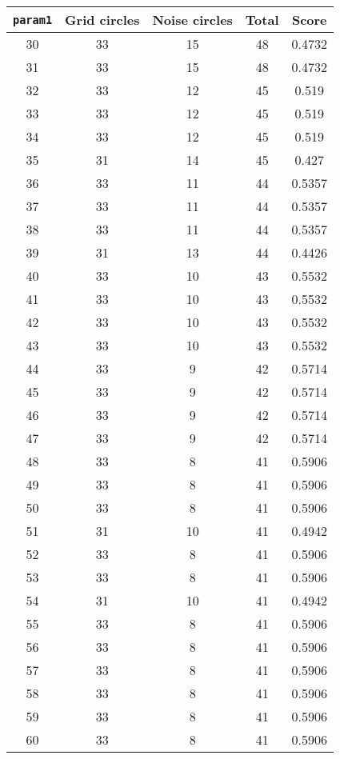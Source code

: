 \documentclass[letterpaper, 12pt]{article}
\begin{document}
\begin{longtable}{|c|c|c|c|c|}
\hline
\textbf{\texttt{param1}} & \textbf{Grid circles} & \textbf{Noise circles} & \textbf{Total} & \textbf{Score} \\
\hline
30 & 33 & 15 & 48 & 0.4732 \\
\hline
31 & 33 & 15 & 48 & 0.4732 \\
\hline
32 & 33 & 12 & 45 & 0.519 \\
\hline
33 & 33 & 12 & 45 & 0.519 \\
\hline
34 & 33 & 12 & 45 & 0.519 \\
\hline
35 & 31 & 14 & 45 & 0.427 \\
\hline
36 & 33 & 11 & 44 & 0.5357 \\
\hline
37 & 33 & 11 & 44 & 0.5357 \\
\hline
38 & 33 & 11 & 44 & 0.5357 \\
\hline
39 & 31 & 13 & 44 & 0.4426 \\
\hline
40 & 33 & 10 & 43 & 0.5532 \\
\hline
41 & 33 & 10 & 43 & 0.5532 \\
\hline
42 & 33 & 10 & 43 & 0.5532 \\
\hline
43 & 33 & 10 & 43 & 0.5532 \\
\hline
44 & 33 & 9 & 42 & 0.5714 \\
\hline
45 & 33 & 9 & 42 & 0.5714 \\
\hline
46 & 33 & 9 & 42 & 0.5714 \\
\hline
47 & 33 & 9 & 42 & 0.5714 \\
\hline
48 & 33 & 8 & 41 & 0.5906 \\
\hline
49 & 33 & 8 & 41 & 0.5906 \\
\hline
50 & 33 & 8 & 41 & 0.5906 \\
\hline
51 & 31 & 10 & 41 & 0.4942 \\
\hline
52 & 33 & 8 & 41 & 0.5906 \\
\hline
53 & 33 & 8 & 41 & 0.5906 \\
\hline
54 & 31 & 10 & 41 & 0.4942 \\
\hline
55 & 33 & 8 & 41 & 0.5906 \\
\hline
56 & 33 & 8 & 41 & 0.5906 \\
\hline
57 & 33 & 8 & 41 & 0.5906 \\
\hline
58 & 33 & 8 & 41 & 0.5906 \\
\hline
59 & 33 & 8 & 41 & 0.5906 \\
\hline
60 & 33 & 8 & 41 & 0.5906 \\
\hline

\end{longtable}
\end{document}
